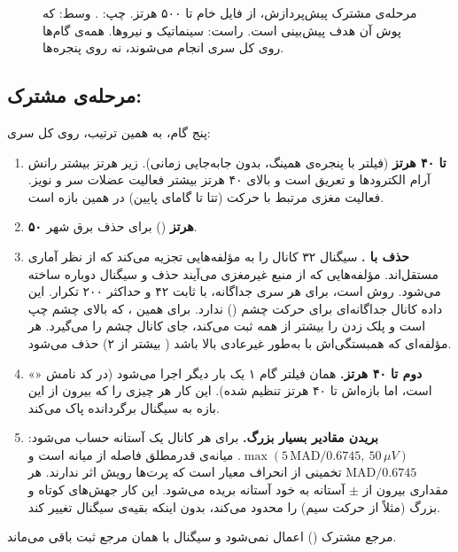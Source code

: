 \begin{figure}[p]
\centering
\resizebox{\textwidth}{!}{}
\caption{مرحله‌ی مشترک پیش‌پردازش، از فایل خام تا  ۵۰۰ هرتز. چپ: . وسط:  که پوش آن هدف پیش‌بینی است. راست: سینماتیک و نیروها. همه‌ی گام‌ها روی کل سری انجام می‌شوند، نه روی پنجره‌ها.}
\label{fig:preproc-shared}
\end{figure}

\subsection{مرحله‌ی مشترک: }

پنج گام، به همین ترتیب، روی کل سری:
\begin{enumerate}
\item \textbf{  تا ۴۰ هرتز} (فیلتر  با پنجره‌ی همینگ، بدون جابه‌جایی زمانی). زیر  هرتز بیشتر رانش آرام الکترودها و تعریق است و بالای ۴۰ هرتز بیشتر فعالیت عضلات سر و نویز. فعالیت مغزی مرتبط با حرکت (تتا تا گامای پایین) در همین بازه است.
\item \textbf{ ۵۰ هرتز} () برای حذف برق شهر.
\item \textbf{حذف  با .}  سیگنال ۳۲ کانال را به مؤلفه‌هایی تجزیه می‌کند که از نظر آماری مستقل‌اند. مؤلفه‌هایی که از منبع غیرمغزی می‌آیند حذف و سیگنال دوباره ساخته می‌شود. روش  است، برای هر سری جداگانه، با  ثابت ۴۲ و حداکثر ۲۰۰ تکرار. این داده کانال جداگانه‌ای برای حرکت چشم () ندارد. برای همین ، که بالای چشم چپ است و پلک زدن را بیشتر از همه ثبت می‌کند، جای کانال چشم را می‌گیرد. هر مؤلفه‌ای که همبستگی‌اش با  به‌طور غیرعادی بالا باشد ( بیشتر از ۲) حذف می‌شود.
\item \textbf{ دوم  تا ۴۰ هرتز.} همان فیلتر گام ۱ یک بار دیگر اجرا می‌شود (در کد نامش «» است، اما بازه‌اش  تا ۴۰ هرتز تنظیم شده). این کار هر چیزی را که  بیرون از این بازه به سیگنال برگردانده پاک می‌کند.
\item \textbf{بریدن مقادیر بسیار بزرگ.} برای هر کانال یک آستانه حساب می‌شود: $\max(5\,\mathrm{MAD}/0.6745,\ 50\,\mu V)$.  میانه‌ی قدرمطلق فاصله از میانه است و $\mathrm{MAD}/0.6745$ تخمینی از انحراف معیار است که پرت‌ها رویش اثر ندارند. هر مقداری بیرون از $\pm$ آستانه به خود آستانه بریده می‌شود. این کار جهش‌های کوتاه و بزرگ (مثلاً از حرکت سیم) را محدود می‌کند، بدون اینکه بقیه‌ی سیگنال تغییر کند.
\end{enumerate}
مرجع مشترک () اعمال نمی‌شود و سیگنال با همان مرجع ثبت باقی می‌ماند.

